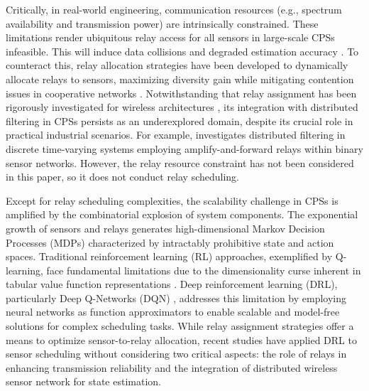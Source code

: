 \documentclass[twocolumn]{IEEEtran}
\begin{document}
Critically, in real-world engineering, communication resources (e.g., spectrum availability and transmission power) are intrinsically constrained. These limitations render ubiquitous relay access for all sensors in large-scale CPSs infeasible. This will induce data collisions and degraded estimation accuracy \cite{cheng2021observer}. To counteract this, relay allocation strategies have been developed to dynamically allocate relays to sensors, maximizing diversity gain while mitigating contention issues in cooperative networks \cite{s2020review}. Notwithstanding that relay assignment has been rigorously investigated for wireless architectures \cite{lyu2023source, shi2008optimal, wang2016relay, xie2013optimal, zhang2011relay}, its integration with distributed filtering in CPSs persists as an underexplored domain, despite its crucial role in practical industrial scenarios. For example, \cite{han2023recursive} investigates distributed filtering in discrete time-varying systems employing amplify-and-forward relays within binary sensor networks. However, the relay resource constraint has not been considered in this paper, so it does not conduct relay scheduling.

Except for relay scheduling complexities, the scalability challenge in CPSs is amplified by the combinatorial explosion of system components. The exponential growth of sensors and relays generates high-dimensional Markov Decision Processes (MDPs) characterized by intractably prohibitive state and action spaces. Traditional reinforcement learning (RL) approaches, exemplified by Q-learning, face fundamental limitations due to the dimensionality curse inherent in tabular value function representations \cite{bertsekas2012dynamic}. Deep reinforcement learning (DRL), particularly Deep Q-Networks (DQN) \cite{guo2023reinforcement, mnih2013playing, mnih2015human}, addresses this limitation by employing neural networks as function approximators to enable scalable and model-free solutions for complex scheduling tasks\cite{sutton1998reinforcement}. While relay assignment strategies offer a means to optimize sensor-to-relay allocation, recent studies \cite{alali2024deep, jung2023optimized, leong2020deep} have applied DRL to sensor scheduling without considering two critical aspects: the role of relays in enhancing transmission reliability and the integration of distributed wireless sensor network for state estimation.
\end{document}
